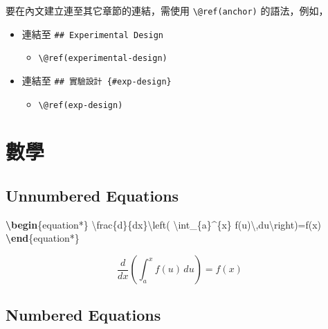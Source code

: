 \documentclass[oneside]{book}
\newenvironment{Shaded}{\begin{snugshade}}{\end{snugshade}}
\newcommand{\KeywordTok}[1]{\textcolor[rgb]{0.13,0.29,0.53}{\textbf{#1}}}
\newcommand{\SpecialCharTok}[1]{\textcolor[rgb]{0.00,0.00,0.00}{#1}}
\newcommand{\SpecialStringTok}[1]{\textcolor[rgb]{0.31,0.60,0.02}{#1}}
\newcommand{\ExtensionTok}[1]{#1}
\newcommand{\NormalTok}[1]{#1}
\providecommand{\tightlist}{%
  \setlength{\itemsep}{0pt}\setlength{\parskip}{0pt}}
\theoremstyle{definition}
\theoremstyle{definition}
\theoremstyle{definition}
\theoremstyle{remark}
\begin{document}
要在內文建立連至其它章節的連結，需使用
\texttt{\textbackslash{}@ref(anchor)} 的語法，例如，

\begin{itemize}
\tightlist
\item
  連結至 \texttt{\#\#\ Experimental\ Design}

  \begin{itemize}
  \tightlist
  \item
    \texttt{\textbackslash{}@ref(experimental-design)}
  \end{itemize}
\item
  連結至 \texttt{\#\#\ 實驗設計\ \{\#exp-design\}}

  \begin{itemize}
  \tightlist
  \item
    \texttt{\textbackslash{}@ref(exp-design)}
  \end{itemize}
\end{itemize}

\section{數學}\label{math}

\subsection{Unnumbered Equations}\label{unnumbered-equations}

\begin{Shaded}
\begin{Highlighting}[]
\KeywordTok{\textbackslash{}begin}\NormalTok{\{}\ExtensionTok{equation*}\NormalTok{\}}\SpecialStringTok{ }
\SpecialCharTok{\textbackslash{}frac}\SpecialStringTok{\{d\}\{dx\}}\SpecialCharTok{\textbackslash{}left}\SpecialStringTok{( }\SpecialCharTok{\textbackslash{}int}\SpecialStringTok{_\{a\}^\{x\} f(u)}\SpecialCharTok{\textbackslash{},}\SpecialStringTok{du}\SpecialCharTok{\textbackslash{}right}\SpecialStringTok{)=f(x)}
\KeywordTok{\textbackslash{}end}\NormalTok{\{}\ExtensionTok{equation*}\NormalTok{\} }
\end{Highlighting}
\end{Shaded}

\begin{equation*} 
\frac{d}{dx}\left( \int_{a}^{x} f(u)\,du\right)=f(x)
\end{equation*}

\subsection{Numbered Equations}\label{numbered-equations}
\end{document}
